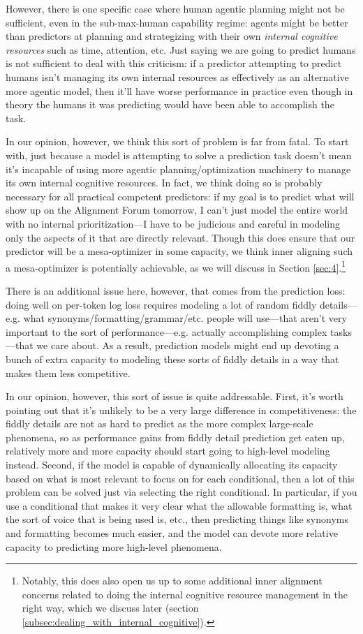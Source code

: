 \documentclass[
  onecolumn,
  nonatbib,
]{miri-tech-article}
\begin{document}
However, there is one specific case where human agentic planning might not be sufficient, even in the sub-max-human capability regime: agents might be better than predictors at planning and strategizing with their own \textit{internal cognitive resources} such as time, attention, etc. Just saying we are going to predict humans is not sufficient to deal with this criticism: if a predictor attempting to predict humans isn't managing its own internal resources as effectively as an alternative more agentic model, then it'll have worse performance in practice even though in theory the humans it was predicting would have been able to accomplish the task.

In our opinion, however, we think this sort of problem is far from fatal. To start with, just because a model is attempting to solve a prediction task doesn't mean it's incapable of using more agentic planning/optimization machinery to manage its own internal cognitive resources. In fact, we think doing so is probably necessary for all practical competent predictors: if my goal is to predict what will show up on the Alignment Forum tomorrow, I can't just model the entire world with no internal prioritization---I have to be judicious and careful in modeling only the aspects of it that are directly relevant. Though this does ensure that our predictor will be a mesa-optimizer\cite{risks} in some capacity, we think inner aligning such a mesa-optimizer is potentially achievable, as we will discuss in Section \ref{sec:4}.\footnote{Notably, this does also open us up to some additional inner alignment concerns related to doing the internal cognitive resource management in the right way, which we discuss later (section \ref{subsec:dealing_with_internal_cognitive}).}

There is an additional issue here, however, that comes from the prediction loss: doing well on per-token log loss requires modeling a lot of random fiddly details---e.g. what synonyms/formatting/grammar/etc. people will use---that aren't very important to the sort of performance---e.g. actually accomplishing complex tasks---that we care about. As a result, prediction models might end up devoting a bunch of extra capacity to modeling these sorts of fiddly details in a way that makes them less competitive.

In our opinion, however, this sort of issue is quite addressable. First, it's worth pointing out that it's unlikely to be a very large difference in competitiveness: the fiddly details are not as hard to predict as the more complex large-scale phenomena, so as performance gains from fiddly detail prediction get eaten up, relatively more and more capacity should start going to high-level modeling instead. Second, if the model is capable of dynamically allocating its capacity based on what is most relevant to focus on for each conditional, then a lot of this problem can be solved just via selecting the right conditional. In particular, if you use a conditional that makes it very clear what the allowable formatting is, what the sort of voice that is being used is, etc., then predicting things like synonyms and formatting becomes much easier, and the model can devote more relative capacity to predicting more high-level phenomena.
\end{document}
